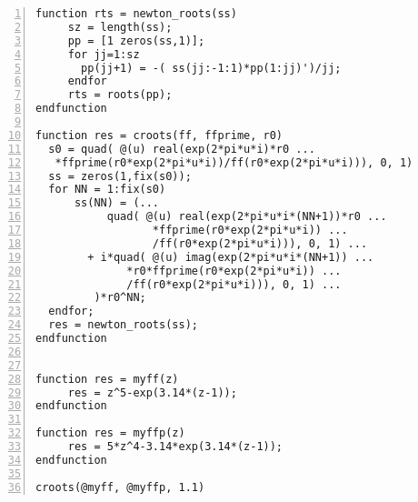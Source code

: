 \documentclass[10pt,oneside,final]{book}
\begin{document}
\begin{Verbatim}[frame=single,xleftmargin=2em,numbers=left]
function rts = newton_roots(ss)
	 sz = length(ss);
	 pp = [1 zeros(ss,1)];
	 for jj=1:sz 
	   pp(jj+1) = -( ss(jj:-1:1)*pp(1:jj)')/jj;
	 endfor
	 rts = roots(pp);
endfunction

function res = croots(ff, ffprime, r0)
  s0 = quad( @(u) real(exp(2*pi*u*i)*r0 ...
   *ffprime(r0*exp(2*pi*u*i))/ff(r0*exp(2*pi*u*i))), 0, 1)
  ss = zeros(1,fix(s0));
  for NN = 1:fix(s0)
      ss(NN) = (...
           quad( @(u) real(exp(2*pi*u*i*(NN+1))*r0 ...
                  *ffprime(r0*exp(2*pi*u*i)) ...
                  /ff(r0*exp(2*pi*u*i))), 0, 1) ...
	    + i*quad( @(u) imag(exp(2*pi*u*i*(NN+1)) ...
              *r0*ffprime(r0*exp(2*pi*u*i)) ...
              /ff(r0*exp(2*pi*u*i))), 0, 1) ...
	     )*r0^NN;
  endfor;
  res = newton_roots(ss);
endfunction


function res = myff(z)
	 res = z^5-exp(3.14*(z-1));
endfunction

function res = myffp(z)
	 res = 5*z^4-3.14*exp(3.14*(z-1));
endfunction

croots(@myff, @myffp, 1.1)
\end{Verbatim}
\end{document}

